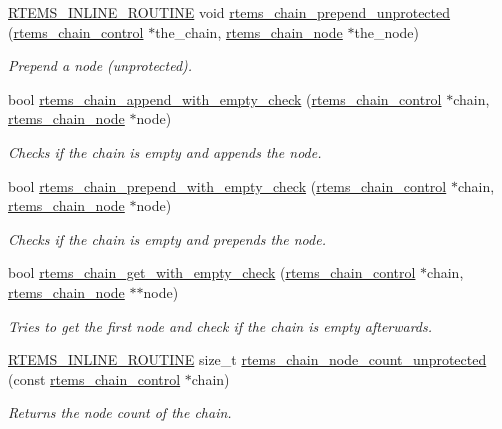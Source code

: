 \begin{DoxyCompactItemize}
\mbox{\hyperlink{group__RTEMSScoreBaseDefs_gac216239df231d5dbd15e3520b0b9313f}{R\+T\+E\+M\+S\+\_\+\+I\+N\+L\+I\+N\+E\+\_\+\+R\+O\+U\+T\+I\+NE}} void \mbox{\hyperlink{group__ClassicChains_ga1d8711c9a9a9813dfba23a18e570bf50}{rtems\+\_\+chain\+\_\+prepend\+\_\+unprotected}} (\mbox{\hyperlink{unionChain__Control}{rtems\+\_\+chain\+\_\+control}} $\ast$the\+\_\+chain, \mbox{\hyperlink{structChain__Node__struct}{rtems\+\_\+chain\+\_\+node}} $\ast$the\+\_\+node)
\begin{DoxyCompactList}\small\item\em Prepend a node (unprotected). \end{DoxyCompactList}\item 
bool \mbox{\hyperlink{group__ClassicChains_ga18e97328c682a96fbbc983cf624a033b}{rtems\+\_\+chain\+\_\+append\+\_\+with\+\_\+empty\+\_\+check}} (\mbox{\hyperlink{unionChain__Control}{rtems\+\_\+chain\+\_\+control}} $\ast$chain, \mbox{\hyperlink{structChain__Node__struct}{rtems\+\_\+chain\+\_\+node}} $\ast$node)
\begin{DoxyCompactList}\small\item\em Checks if the {\itshape chain} is empty and appends the {\itshape node}. \end{DoxyCompactList}\item 
bool \mbox{\hyperlink{group__ClassicChains_gaac656ee126f96d8f5a45c68927ea13d2}{rtems\+\_\+chain\+\_\+prepend\+\_\+with\+\_\+empty\+\_\+check}} (\mbox{\hyperlink{unionChain__Control}{rtems\+\_\+chain\+\_\+control}} $\ast$chain, \mbox{\hyperlink{structChain__Node__struct}{rtems\+\_\+chain\+\_\+node}} $\ast$node)
\begin{DoxyCompactList}\small\item\em Checks if the {\itshape chain} is empty and prepends the {\itshape node}. \end{DoxyCompactList}\item 
bool \mbox{\hyperlink{group__ClassicChains_gad87341d58edec44ef841a5103a922e5c}{rtems\+\_\+chain\+\_\+get\+\_\+with\+\_\+empty\+\_\+check}} (\mbox{\hyperlink{unionChain__Control}{rtems\+\_\+chain\+\_\+control}} $\ast$chain, \mbox{\hyperlink{structChain__Node__struct}{rtems\+\_\+chain\+\_\+node}} $\ast$$\ast$node)
\begin{DoxyCompactList}\small\item\em Tries to get the first {\itshape node} and check if the {\itshape chain} is empty afterwards. \end{DoxyCompactList}\item 
\mbox{\hyperlink{group__RTEMSScoreBaseDefs_gac216239df231d5dbd15e3520b0b9313f}{R\+T\+E\+M\+S\+\_\+\+I\+N\+L\+I\+N\+E\+\_\+\+R\+O\+U\+T\+I\+NE}} size\+\_\+t \mbox{\hyperlink{group__ClassicChains_ga33042af3bb3a9b2903ce85d09cc6bf8f}{rtems\+\_\+chain\+\_\+node\+\_\+count\+\_\+unprotected}} (const \mbox{\hyperlink{unionChain__Control}{rtems\+\_\+chain\+\_\+control}} $\ast$chain)
\begin{DoxyCompactList}\small\item\em Returns the node count of the chain. \end{DoxyCompactList}\end{DoxyCompactItemize}


